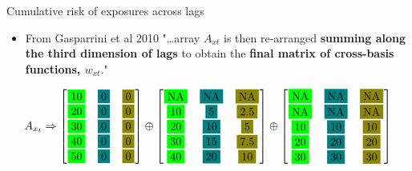 \documentclass[english]{beamer}
\newcommand{\alertblue}[1]{{\color{blue}#1}}
\begin{document}
\begin{frame}{Cumulative risk of exposures across lags}
\begin{itemize}
    \item From Gasparrini et al 2010 "\ldots array \alertblue{\(A_{xt}\)} is then re-arranged \textbf{\alertblue{summing along the third dimension of lags}} to obtain the \alertblue{\textbf{final matrix of cross-basis functions, \(w_{xt}\)}}." 
\end{itemize}
\vspace{0.3cm}
\[
A_{x_t}
\Rightarrow 
\begin{bmatrix}
\fcolorbox{white}{green}{10} & \fcolorbox{white}{teal}{0} & \fcolorbox{white}{olive}{0} \\
\fcolorbox{white}{green}{20} & \fcolorbox{white}{teal}{0} & \fcolorbox{white}{olive}{0} \\
\fcolorbox{white}{green}{30} & \fcolorbox{white}{teal}{0} & \fcolorbox{white}{olive}{0} \\
\fcolorbox{white}{green}{40} & \fcolorbox{white}{teal}{0} & \fcolorbox{white}{olive}{0} \\ 
\fcolorbox{white}{green}{50} & \fcolorbox{white}{teal}{0} & \fcolorbox{white}{olive}{0}
\end{bmatrix} \oplus
\begin{bmatrix}
\fcolorbox{white}{green}{NA} & \fcolorbox{white}{teal}{NA} & \fcolorbox{white}{olive}{NA} \\ 
\fcolorbox{white}{green}{10} & \fcolorbox{white}{teal}{5} & \fcolorbox{white}{olive}{2.5} \\
\fcolorbox{white}{green}{20} & \fcolorbox{white}{teal}{10} & \fcolorbox{white}{olive}{5} \\
\fcolorbox{white}{green}{30} & \fcolorbox{white}{teal}{15} & \fcolorbox{white}{olive}{7.5} \\
\fcolorbox{white}{green}{40} & \fcolorbox{white}{teal}{20} & \fcolorbox{white}{olive}{10}
\end{bmatrix} \oplus
\begin{bmatrix}
\fcolorbox{white}{green}{NA} & \fcolorbox{white}{teal}{NA} & \fcolorbox{white}{olive}{NA} \\
\fcolorbox{white}{green}{NA} & \fcolorbox{white}{teal}{NA} & \fcolorbox{white}{olive}{NA} \\
\fcolorbox{white}{green}{10} & \fcolorbox{white}{teal}{10} & \fcolorbox{white}{olive}{10} \\
\fcolorbox{white}{green}{20} & \fcolorbox{white}{teal}{20} & \fcolorbox{white}{olive}{20} \\
\fcolorbox{white}{green}{30} & \fcolorbox{white}{teal}{30} & \fcolorbox{white}{olive}{30} 
\end{bmatrix}
\]


\end{frame}
\end{document}
